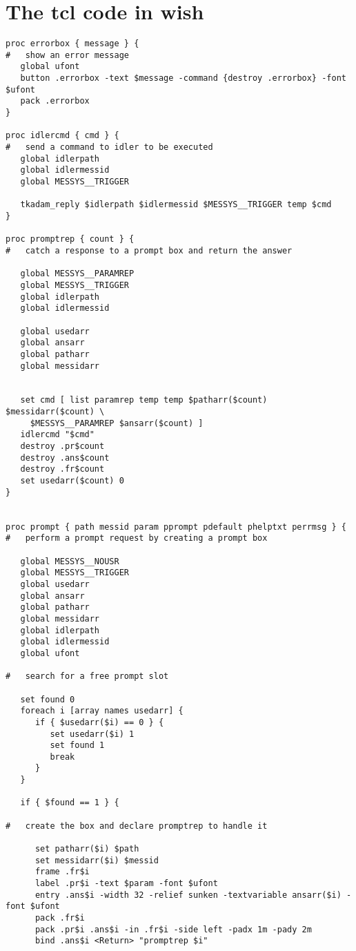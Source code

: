 \newpage
\section {The tcl code in wish}

\begin{verbatim}
proc errorbox { message } {
#   show an error message
   global ufont
   button .errorbox -text $message -command {destroy .errorbox} -font $ufont
   pack .errorbox
}

proc idlercmd { cmd } {
#   send a command to idler to be executed
   global idlerpath
   global idlermessid
   global MESSYS__TRIGGER

   tkadam_reply $idlerpath $idlermessid $MESSYS__TRIGGER temp $cmd
}

proc promptrep { count } {
#   catch a response to a prompt box and return the answer

   global MESSYS__PARAMREP
   global MESSYS__TRIGGER
   global idlerpath
   global idlermessid

   global usedarr
   global ansarr
   global patharr
   global messidarr


   set cmd [ list paramrep temp temp $patharr($count) $messidarr($count) \
     $MESSYS__PARAMREP $ansarr($count) ]
   idlercmd "$cmd"
   destroy .pr$count
   destroy .ans$count
   destroy .fr$count
   set usedarr($count) 0
}


proc prompt { path messid param pprompt pdefault phelptxt perrmsg } {
#   perform a prompt request by creating a prompt box

   global MESSYS__NOUSR
   global MESSYS__TRIGGER
   global usedarr
   global ansarr
   global patharr
   global messidarr
   global idlerpath
   global idlermessid
   global ufont

#   search for a free prompt slot

   set found 0
   foreach i [array names usedarr] {
      if { $usedarr($i) == 0 } {
         set usedarr($i) 1
         set found 1
         break
      }
   }

   if { $found == 1 } {

#   create the box and declare promptrep to handle it

      set patharr($i) $path
      set messidarr($i) $messid
      frame .fr$i
      label .pr$i -text $param -font $ufont
      entry .ans$i -width 32 -relief sunken -textvariable ansarr($i) -font $ufont
      pack .fr$i
      pack .pr$i .ans$i -in .fr$i -side left -padx 1m -pady 2m
      bind .ans$i <Return> "promptrep $i"


\end{verbatim}

